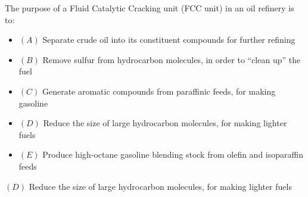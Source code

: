 

The purpose of a Fluid Catalytic Cracking unit (FCC unit) in an oil refinery is to:

\begin{itemize}
\item{$(A)$} Separate crude oil into its constituent compounds for further refining
\vskip 5pt
\item{$(B)$} Remove sulfur from hydrocarbon molecules, in order to ``clean up'' the fuel
\vskip 5pt
\item{$(C)$} Generate aromatic compounds from paraffinic feeds, for making gasoline
\vskip 5pt
\item{$(D)$} Reduce the size of large hydrocarbon molecules, for making lighter fuels
\vskip 5pt
\item{$(E)$} Produce high-octane gasoline blending stock from olefin and isoparaffin feeds
\end{itemize}







\item{$(D)$} Reduce the size of large hydrocarbon molecules, for making lighter fuels
 









